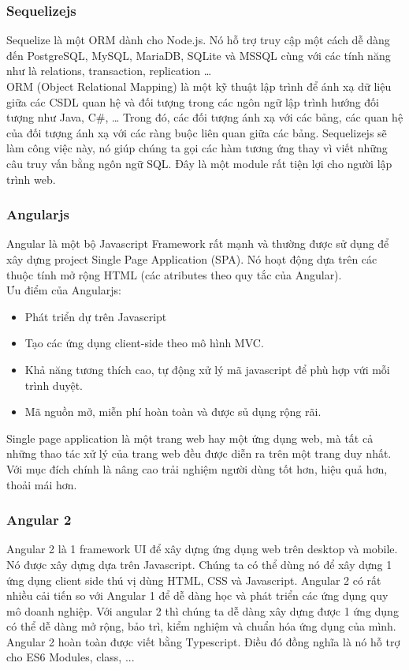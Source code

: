 \documentclass[a4paper,12pt,oneside]{article}
\begin{document}
\subsubsection{Sequelizejs}
\noindent Sequelize là một ORM dành cho Node.js. Nó hỗ trợ truy cập một cách dễ dàng đến PostgreSQL, MySQL, MariaDB, SQLite và MSSQL cùng với các tính năng như là relations, transaction, replication …\\
 ORM (Object Relational Mapping) là một kỹ thuật lập trình để ánh xạ dữ liệu giữa các CSDL quan hệ và đối tượng trong các ngôn ngữ lập trình hướng đối tượng như Java, C\#, … Trong đó, các đối tượng ánh xạ với các bảng, các quan hệ của đối tượng ánh xạ với các ràng buộc liên quan giữa các bảng. Sequelizejs sẽ làm công việc này, nó giúp chúng ta gọi các hàm tương ứng thay vì viết những câu truy vấn bằng ngôn ngữ SQL. Đây là một module rất tiện lợi cho người lập trình web.
\subsubsection{Angularjs}
\noindent Angular là một bộ Javascript Framework rất mạnh và thường được sử dụng để xây dựng project Single Page Application (SPA). Nó hoạt động dựa trên các thuộc tính mở rộng HTML (các atributes theo quy tắc của Angular).\\
Ưu điểm của Angularjs:
\begin{itemize}
\item Phát triển dự trên Javascript
\item Tạo các ứng dụng client-side theo mô hình MVC.
\item Khả năng tương thích cao, tự động xử lý mã javascript để phù hợp vứi mỗi trình duyệt.
\item Mã nguồn mở, miễn phí hoàn toàn và được sủ dụng rộng rãi.
\end{itemize}

\noindent Single page application là một trang web hay một ứng dụng web, mà tất cả những thao tác xử lý của trang web đều được diễn ra trên một trang duy nhất. Với mục đích chính là nâng cao trải nghiệm người dùng tốt hơn, hiệu quả hơn, thoải mái hơn. 

\subsubsection{Angular 2}
\noindent Angular 2 là 1 framework UI để xây dựng ứng dụng web trên desktop và mobile. 
Nó được xây dựng dựa trên Javascript. Chúng ta có thể dùng nó để xây dựng 1 ứng dụng client side thú vị dùng HTML, CSS và Javascript. 
Angular 2 có rất nhiều cải tiến so với Angular 1 để dễ dàng học và phát triển các ứng dụng quy mô doanh nghiệp. 
Với angular 2 thì chúng ta dễ dàng xây dựng được 1 ứng dụng có thể dễ dàng mở rộng, bảo trì, kiểm nghiệm và chuẩn hóa ứng dụng của mình. 
Angular 2 hoàn toàn được viết bằng Typescript. Điều đó đồng nghĩa là nó hỗ trợ cho ES6 Modules, class, ...
\end{document}
